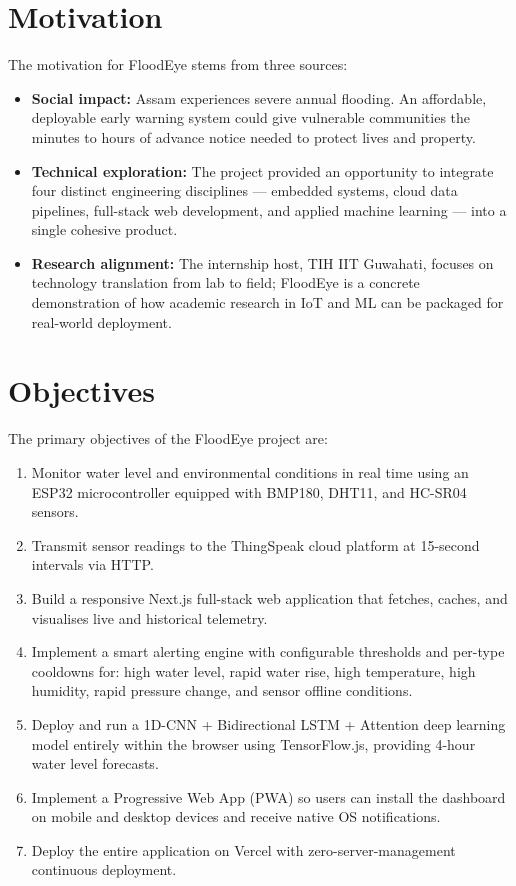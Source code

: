 \section{Motivation}

The motivation for FloodEye stems from three sources:

\begin{itemize}[leftmargin=1.5em]
  \item \textbf{Social impact:} Assam experiences severe annual flooding. An affordable, deployable early warning system could give vulnerable communities the minutes to hours of advance notice needed to protect lives and property.
  \item \textbf{Technical exploration:} The project provided an opportunity to integrate four distinct engineering disciplines — embedded systems, cloud data pipelines, full-stack web development, and applied machine learning — into a single cohesive product.
  \item \textbf{Research alignment:} The internship host, TIH IIT Guwahati, focuses on technology translation from lab to field; FloodEye is a concrete demonstration of how academic research in IoT and ML can be packaged for real-world deployment.
\end{itemize}

\section{Objectives}

The primary objectives of the FloodEye project are:

\begin{enumerate}[leftmargin=1.5em]
  \item Monitor water level and environmental conditions in real time using an ESP32 microcontroller equipped with BMP180, DHT11, and HC-SR04 sensors.
  \item Transmit sensor readings to the ThingSpeak cloud platform at 15-second intervals via HTTP.
  \item Build a responsive Next.js full-stack web application that fetches, caches, and visualises live and historical telemetry.
  \item Implement a smart alerting engine with configurable thresholds and per-type cooldowns for: high water level, rapid water rise, high temperature, high humidity, rapid pressure change, and sensor offline conditions.
  \item Deploy and run a 1D-CNN + Bidirectional LSTM + Attention deep learning model entirely within the browser using TensorFlow.js, providing 4-hour water level forecasts.
  \item Implement a Progressive Web App (PWA) so users can install the dashboard on mobile and desktop devices and receive native OS notifications.
  \item Deploy the entire application on Vercel with zero-server-management continuous deployment.
\end{enumerate}

